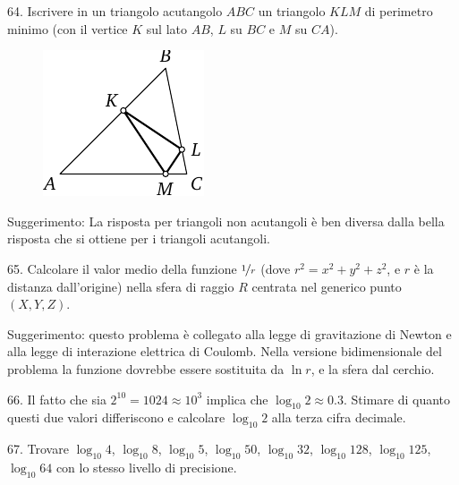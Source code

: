 \begin{problem}{64.}
	 Iscrivere in un triangolo acutangolo $ABC$ un triangolo $KLM$ di perimetro minimo
	(con il vertice $K$ sul lato $AB$, $L$ su $BC$ e $M$ su $CA$).
	\begin{figure}
		\includegraphics{resources/taskbook-48} 
	\end{figure}

	\begin{note}{Suggerimento:}
		La risposta per triangoli non acutangoli è ben diversa dalla bella risposta che si ottiene per i triangoli acutangoli.
	\end{note}
\end{problem}

\begin{problem}{65.}
	Calcolare il valor medio della funzione $\nicefrac{1}{r}$ (dove
	$r^2=x^2+y^2+z^2$, e $r$ è la distanza dall’origine) nella sfera di raggio 
	$R$ centrata nel generico punto $(X,Y,Z)$.

	\begin{note}{Suggerimento:}
 questo problema è collegato alla legge di gravitazione di Newton e alla legge di interazione elettrica di Coulomb. Nella versione bidimensionale del problema la funzione dovrebbe essere sostituita da $\ln r$, e la sfera dal cerchio.
	\end{note}
\end{problem}

\begin{problem}{66.}
	Il fatto che sia $2^{10}=1024 \approx 10^3$ implica che
	$\log_{10} 2 \approx 0.3$. Stimare di quanto questi due valori differiscono e calcolare $\log_{10} 2$  alla terza cifra decimale.
\end{problem}

\begin{problem}{67.}
	Trovare $\log_{10} 4$, $\log_{10} 8$,
	$\log_{10} 5$, $\log_{10} 50$, $\log_{10} 32$, $\log_{10} 128$,
	$\log_{10} 125$, $\log_{10} 64$ con lo stesso livello di precisione.
\end{problem}

